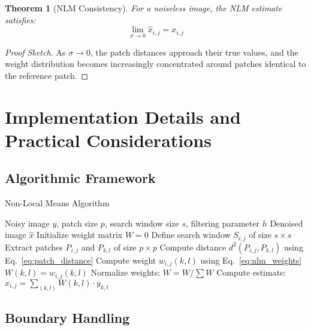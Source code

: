 \documentclass[12pt]{article}
\newtheorem{theorem}{Theorem}[section]
\begin{document}
\begin{theorem}[NLM Consistency]
    \label{thm:nlm_consistency}
    For a noiseless image, the NLM estimate satisfies:
    \begin{equation}
        \lim_{\sigma \to 0} \hat{x}_{i,j} = x_{i,j}
    \end{equation}
\end{theorem}

\begin{proof}[Proof Sketch]
    As $\sigma \to 0$, the patch distances approach their true values, and the weight distribution becomes increasingly concentrated around patches identical to the reference patch.
\end{proof}

\newpage

\section{Implementation Details and Practical Considerations}
\label{sec:implementation}

\subsection{Algorithmic Framework}
\label{subsec:algorithm}

\begin{algorithm}
    \caption{Non-Local Means Algorithm}
    \label{alg:nlm}
    \begin{algorithmic}[1]
        \REQUIRE Noisy image $y$, patch size $p$, search window size $s$, filtering parameter $h$
        \ENSURE Denoised image $\hat{x}$
        \STATE Initialize weight matrix $W = 0$
        \STATE Define search window $S_{i,j}$ of size $s \times s$
        \STATE Extract patches $P_{i,j}$ and $P_{k,l}$ of size $p \times p$
        \STATE Compute distance $d^2(P_{i,j}, P_{k,l})$ using Eq.~\ref{eq:patch_distance}
        \STATE Compute weight $w_{i,j}(k,l)$ using Eq.~\ref{eq:nlm_weights}
        \STATE $W(k,l) = w_{i,j}(k,l)$
        \ENDFOR
        \STATE Normalize weights: $W = W / \sum W$
        \STATE Compute estimate: $\hat{x}_{i,j} = \sum_{(k,l)} W(k,l) \cdot y_{k,l}$
        \ENDFOR
    \end{algorithmic}
\end{algorithm}

\subsection{Boundary Handling}
\label{subsec:boundary}
\end{document}
